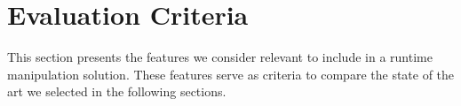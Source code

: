 
\section{Evaluation Criteria}\label{sec:runtime_modification_criteria}

This section presents the features we consider relevant to include in a runtime manipulation solution. These features serve as criteria to compare the state of the art we selected in the following sections.


